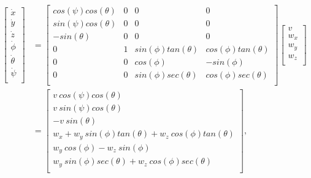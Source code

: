 \begin{equation}
\label{eq:Full6DOFKinEqAUV3D}
\begin{split}
	\begin{bmatrix}
		\dot{x}\\
		\dot{y}\\
		\dot{z}\\
		\dot{\phi}\\ 
		\dot{\theta}\\
		\dot{\psi}\\
	\end{bmatrix} & =
	\begin{bmatrix}
		cos\left(\psi\right)cos\left(\theta\right) & 0 & 0 & 0\\
		sin\left(\psi\right)cos\left(\theta\right) & 0 & 0 & 0\\
		-sin\left(\theta\right) & 0 & 0 & 0\\
		0 & 1 & sin\left(\phi\right)tan\left(\theta\right) & cos\left(\phi\right)tan\left(\theta\right)\\
		0 & 0 & cos\left(\phi\right) & -sin\left(\phi\right)\\
		0 & 0 & sin\left(\phi\right)sec\left(\theta\right) & cos\left(\phi\right)sec\left(\theta\right)\\
	\end{bmatrix}
	\begin{bmatrix}
		v\\
		w_x\\
		w_y\\
		w_z\\
	\end{bmatrix}\\
	& = \begin{bmatrix}
		v\ cos\left(\psi\right)cos\left(\theta\right)\\
		v\ sin\left(\psi\right)cos\left(\theta\right)\\
		-v\ sin\left(\theta\right)\\
		w_x + w_y\ sin\left(\phi\right)tan\left(\theta\right) +
		w_z\ cos\left(\phi\right)tan\left(\theta\right)\\
		w_y\ cos\left(\phi\right) -w_z\ sin\left(\phi\right)\\
		w_y\ sin\left(\phi\right)sec\left(\theta\right) + w_z\ cos\left(\phi\right)sec\left(\theta\right)\\
	\end{bmatrix}
	\text{,}
\end{split}
\end{equation}

